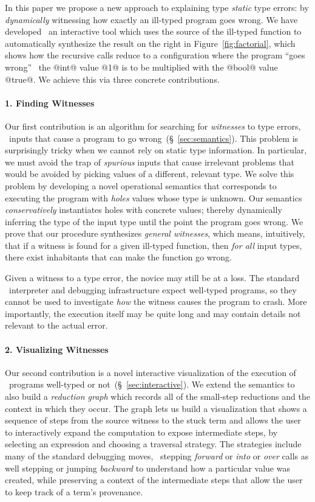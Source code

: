 In this paper we propose a new approach to explaining type
\emph{static} type errors: by \emph{dynamically} witnessing
how exactly an ill-typed program goes wrong.
%
We have developed \toolname\ an interactive tool which uses
the source of the ill-typed function to automatically synthesize
the result on the right in Figure~\ref{fig:factorial}, which
shows how the recursive calls reduce to a configuration where
the program ``goes wrong'' \ie\ the @int@ value @1@ is to be
multiplied with the @bool@ value @true@.
We achieve this via three concrete contributions.

\paragraph{1. Finding Witnesses}
Our first contribution is an algorithm for searching for
\emph{witnesses} to type errors, \ie\ inputs that cause a
program to go wrong~(\S~\ref{sec:semantics}).
%
This problem is surprisingly tricky when we cannot rely on
static type information.
%
In particular, we must avoid the trap of \emph{spurious} inputs
that cause irrelevant problems that would be avoided by picking
values of a different, relevant type.
%
We solve this problem by developing a novel operational semantics
that corresponds to executing the program with \emph{holes}
values whose type is unknown.
%
Our semantics \emph{conservatively} instantiates holes with concrete
values; thereby dynamically inferring the type of the input type
until the point the program goes wrong.
%
We prove that our procedure synthesizes \emph{general witnesses},
which means, intuitively, that if a witness is found for a given
ill-typed function, then \emph{for all} input types, there exist
inhabitants that can make the function go wrong.

Given a witness to a type error, the novice may still be at a loss.
%
The standard \ocaml\ interpreter and debugging infrastructure expect
well-typed programs, so they cannot be used to investigate \emph{how}
the witness causes the program to crash.
%
More importantly, the execution itself may be quite long and may contain
details not relevant to the actual error.

\paragraph{2. Visualizing Witnesses}
Our second contribution is a novel interactive visualization of the
execution of \ocaml\ programs well-typed or not~(\S~\ref{sec:interactive}).
%
We extend the semantics to also build a \emph{reduction graph}
which records all of the small-step reductions and the context
in which they occur.
%
The graph lets us build a visualization that shows a sequence of
steps from the source witness to the stuck term and allows the user
to interactively expand the  computation to expose intermediate steps,
by selecting an expression and choosing a traversal strategy.
%
The strategies include many of the standard debugging moves, \eg\
stepping \emph{forward} or \emph{into} or \emph{over} calls as well
stepping or jumping \emph{backward} to understand how a particular
value was created, while preserving a context of the intermediate
steps that allow the user to keep track of a term's provenance.

